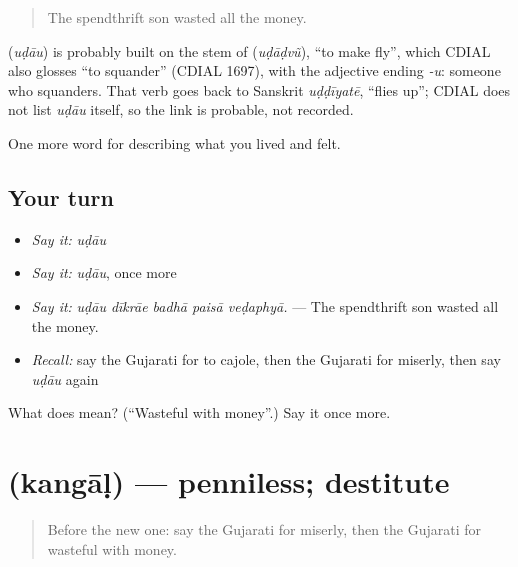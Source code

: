 \begin{quote}
The spendthrift son wasted all the money.
\end{quote}

\begin{cousinweb}
\textbf{} (\emph{uḍāu}) is probably built on the stem of \textbf{} (\emph{uḍāḍvũ}), \textquotedblleft{}to make fly\textquotedblright{}, which CDIAL also glosses \textquotedblleft{}to squander\textquotedblright{} (CDIAL 1697), with the adjective ending \emph{-u}: someone who squanders. That verb goes back to Sanskrit \emph{uḍḍīyatē}, \textquotedblleft{}flies up\textquotedblright{}; CDIAL does not list \emph{uḍāu} itself, so the link is probable, not recorded.
\end{cousinweb}

\begin{grammarlens}[title={What you've built}]
One more word for describing what you lived and felt.
\end{grammarlens}

\subsection*{Your turn}
\begin{itemize}
\raggedright
  \item \emph{Say it:} \emph{uḍāu}
  \item \emph{Say it:} \emph{uḍāu}, once more
  \item \emph{Say it:} \emph{uḍāu dīkrāe badhā paisā veḍaphyā.} — The spendthrift son wasted all the money.
  \item \emph{Recall:} say the Gujarati for to cajole, then the Gujarati for miserly, then say \emph{uḍāu} again
\end{itemize}

\begin{tcolorbox}[breakable,colback=teal!4,colframe=teal!35!black,title={Before you move on}]
What does  mean? (\textquotedblleft{}Wasteful with money\textquotedblright{}.) Say it once more.
\end{tcolorbox}
\section[\texorpdfstring{\gu{કંગાળ} (kangāḷ)}{કંગાળ (kangāḷ)}]{ (kangāḷ) — penniless; destitute}

\label{lesson:GU-C461-kangal}



\begin{quote}
Before the new one: say the Gujarati for miserly, then the Gujarati for wasteful with money.
\end{quote}

